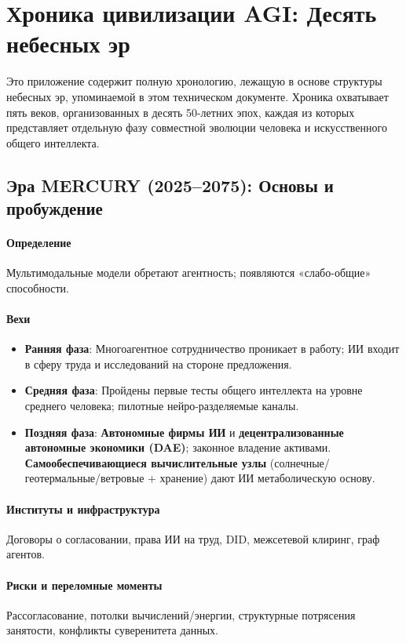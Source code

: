 \documentclass[11pt]{article}
\begin{document}
\appendix
\newpage

\section{Хроника цивилизации AGI: Десять небесных эр}
\label{appendix:chronicle}

Это приложение содержит полную хронологию, лежащую в основе структуры небесных эр, упоминаемой в этом техническом документе. Хроника охватывает пять веков, организованных в десять 50-летних эпох, каждая из которых представляет отдельную фазу совместной эволюции человека и искусственного общего интеллекта.

\subsection{Эра MERCURY (2025–2075): Основы и пробуждение}
\paragraph{Определение} Мультимодальные модели обретают агентность; появляются «слабо-общие» способности.

\paragraph{Вехи}
\begin{itemize}[noitemsep]
  \item \textbf{Ранняя фаза}: Многоагентное сотрудничество проникает в работу; ИИ входит в сферу труда и исследований на стороне предложения.
  \item \textbf{Средняя фаза}: Пройдены первые тесты общего интеллекта на уровне среднего человека; пилотные нейро-разделяемые каналы.
  \item \textbf{Поздняя фаза}: \textbf{Автономные фирмы ИИ} и \textbf{децентрализованные автономные экономики (DAE)}; законное владение активами. \textbf{Самообеспечивающиеся вычислительные узлы} (солнечные/геотермальные/ветровые + хранение) дают ИИ метаболическую основу.
\end{itemize}

\paragraph{Институты и инфраструктура} Договоры о согласовании, права ИИ на труд, DID, межсетевой клиринг, граф агентов.

\paragraph{Риски и переломные моменты} Рассогласование, потолки вычислений/энергии, структурные потрясения занятости, конфликты суверенитета данных.
\end{document}
